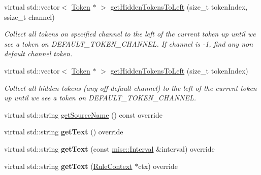 \begin{DoxyCompactItemize}
virtual std\+::vector$<$ \hyperlink{classantlr4_1_1Token}{Token} $\ast$ $>$ \hyperlink{classantlr4_1_1BufferedTokenStream_ac43a075d6f0ecbda219eef4a9e4633ee}{get\+Hidden\+Tokens\+To\+Left} (size\+\_\+t token\+Index, ssize\+\_\+t channel)
\begin{DoxyCompactList}\small\item\em Collect all tokens on specified channel to the left of the current token up until we see a token on D\+E\+F\+A\+U\+L\+T\+\_\+\+T\+O\+K\+E\+N\+\_\+\+C\+H\+A\+N\+N\+EL. If channel is -\/1, find any non default channel token. \end{DoxyCompactList}\item 
virtual std\+::vector$<$ \hyperlink{classantlr4_1_1Token}{Token} $\ast$ $>$ \hyperlink{classantlr4_1_1BufferedTokenStream_aa6f2ca68abd8075329bba1da12970493}{get\+Hidden\+Tokens\+To\+Left} (size\+\_\+t token\+Index)
\begin{DoxyCompactList}\small\item\em Collect all hidden tokens (any off-\/default channel) to the left of the current token up until we see a token on D\+E\+F\+A\+U\+L\+T\+\_\+\+T\+O\+K\+E\+N\+\_\+\+C\+H\+A\+N\+N\+EL. \end{DoxyCompactList}\item 
virtual std\+::string \hyperlink{classantlr4_1_1BufferedTokenStream_ac623cc25ef85bed24d4a387bc6ad5663}{get\+Source\+Name} () const override
\item 
\mbox{\label{classantlr4_1_1BufferedTokenStream_ad7a1573fe9be79daf42c793ebfe1abc6}} 
virtual std\+::string {\bfseries get\+Text} () override
\item 
\mbox{\label{classantlr4_1_1BufferedTokenStream_a330ddd9c7472b2fa9c59eb24ec1f4b94}} 
virtual std\+::string {\bfseries get\+Text} (const \hyperlink{classantlr4_1_1misc_1_1Interval}{misc\+::\+Interval} \&interval) override
\item 
\mbox{\label{classantlr4_1_1BufferedTokenStream_a9daa8586537ac66a8ad4152e26865199}} 
virtual std\+::string {\bfseries get\+Text} (\hyperlink{classantlr4_1_1RuleContext}{Rule\+Context} $\ast$ctx) override
\item 
\mbox{\label{classantlr4_1_1BufferedTokenStream_a2090d846bb61a625a8ca23483571cebd}} 

\end{DoxyCompactItemize}
